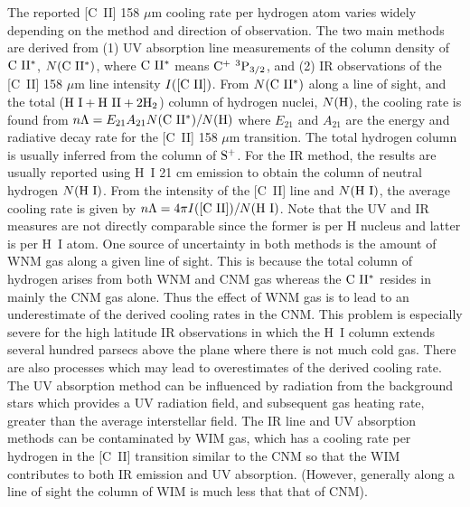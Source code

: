 \documentclass[12pt,preprint,flushrt]{aastex}
\begin{document}
The reported [C~II] 
158 $\mu$m cooling rate per hydrogen atom  
varies widely depending on the method 
and direction of observation. The two main methods are derived 
from (1) UV absorption line measurements of 
the column density of ${\rm C~II^*}$,
$N({\rm C~II^*})$, where ${\rm C~II^*}$ means 
${\rm C^+\,\, ^3P_{3/2}}$, and (2)
IR observations of the [C~II] 158 $\mu$m line intensity $I([{\rm C~II}])$.
From $N({\rm C~II^*})$ along a line of sight,
and the total (${\rm H~I + H~II + 2H_2}$) column of 
hydrogen nuclei, $N({\rm H})$, the cooling rate 
is found from $n\Lambda = E_{21}
A_{21}N({\rm C~II^*})/N({\rm H)}$ where $E_{21}$ and $A_{21}$ are the
energy and radiative decay rate for the [C~II] 158 $\mu$m 
transition. The total hydrogen column is usually inferred from the 
column of ${\rm S^+}$. For the IR method, the results are 
usually reported using H~I 21 cm emission to obtain the column 
of neutral hydrogen $N({\rm H~I})$.  
From the intensity of the [C~II] line and $N({\rm H~I})$,
the average cooling rate is given by 
$n\Lambda = 4 \pi I([{\rm C~II}])/N({\rm H~I})$. 
Note that the UV and IR measures are not directly
comparable since the former is per H nucleus and 
latter is per H~I atom.
One source of uncertainty in both methods 
is the amount of WNM gas along a given line of sight. 
This is because the total column of hydrogen
arises from both WNM and CNM gas whereas the ${\rm C~II^*}$ 
resides in mainly the CNM gas alone. Thus the effect of WNM
gas is to lead to an underestimate of the derived cooling 
rates in the CNM.
This problem is especially severe for the high latitude 
IR observations in which the H~I column extends several
hundred parsecs above the plane where there is not much
cold gas. There are also processes which may lead  to overestimates
of the derived cooling rate.  The UV absorption method can be influenced by 
radiation from the background stars
which provides a UV radiation field, and  subsequent gas heating rate,
greater than
the average interstellar field. 
The IR line and UV absorption methods can be contaminated  by WIM gas,
which has a cooling rate per hydrogen in the [C~II] transition 
similar to the CNM so that the WIM contributes to both IR emission and
UV absorption. (However, generally along a line of sight the column
of WIM is much less that that of CNM).
\end{document}

